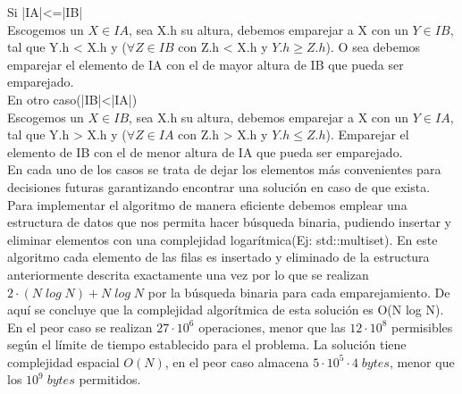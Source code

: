 \documentclass{report}
\begin{document}
Si |IA|<=|IB|\\ 
Escogemos un $X \in IA$, sea X.h su altura, debemos emparejar a X con un $Y \in IB$, tal que Y.h < X.h y ($\forall Z \in IB$ con Z.h < X.h y $Y.h \geq Z.h$). O sea debemos emparejar el elemento de IA con el de mayor altura de IB que pueda ser emparejado.\\ 
En otro caso(|IB|<|IA|)\\
Escogemos un $X \in IB$, sea X.h su altura, debemos emparejar a X con un $Y \in IA$, tal que Y.h > X.h y ($\forall Z \in IA$ con Z.h > X.h y $Y.h \leq Z.h$). Emparejar el elemento de IB con el de menor altura de IA que pueda ser emparejado.\\
En cada uno de los casos se trata de dejar los elementos m\'as convenientes para decisiones futuras garantizando encontrar una soluci\'on en caso de que exista.
Para implementar el algoritmo de manera eficiente debemos emplear una estructura de datos que nos permita hacer b\'usqueda binaria, pudiendo insertar y eliminar elementos con una complejidad logar\'itmica(Ej: std::multiset).
En este algoritmo cada elemento de las filas es insertado y eliminado de la estructura anteriormente descrita exactamente una vez por lo que se realizan $2\cdot(N\; log \;N) + N\; log\; N$ por la b\'usqueda binaria para cada emparejamiento. De aqu\'i se concluye que la complejidad algor\'itmica de esta soluci\'on es O(N log N). En el peor caso se realizan $27\cdot 10^6$ operaciones, menor que las $12 \cdot 10^8$ permisibles seg\'un el l\'imite de tiempo establecido para el problema. La soluci\'on tiene complejidad espacial $O(N)$, en el peor caso almacena $5\cdot 10^5 \cdot 4\; bytes$, menor que los $10^9 \;bytes$ permitidos.
\end{document}
